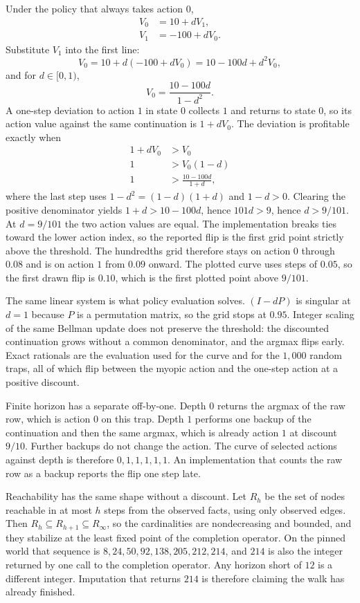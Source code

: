 \documentclass[10pt,twocolumn,letterpaper]{article}
\begin{document}
Under the policy that always takes action $0$,
\begin{align}
V_0 &= 10 + d V_1, \\
V_1 &= -100 + d V_0.
\end{align}
Substitute $V_1$ into the first line:
\[
V_0 = 10 + d(-100 + d V_0) = 10 - 100d + d^2 V_0,
\]
and for $d\in[0,1)$,
\[
V_0 = \frac{10-100d}{1-d^2}.
\]
A one-step deviation to action $1$ in state $0$ collects $1$ and returns to state $0$, so its action value against the same continuation is $1+dV_0$.
The deviation is profitable exactly when
\begin{align}
1 + d V_0 &> V_0 \\
1 &> V_0(1-d) \\
1 &> \frac{10-100d}{1+d},
\end{align}
where the last step uses $1-d^2=(1-d)(1+d)$ and $1-d>0$.
Clearing the positive denominator yields $1+d > 10-100d$, hence $101d>9$, hence $d>9/101$.
At $d=9/101$ the two action values are equal.
The implementation breaks ties toward the lower action index, so the reported flip is the first grid point strictly above the threshold.
The hundredths grid therefore stays on action $0$ through $0.08$ and is on action $1$ from $0.09$ onward.
The plotted curve uses steps of $0.05$, so the first drawn flip is $0.10$, which is the first plotted point above $9/101$.

The same linear system is what policy evaluation solves.
$(I-dP)$ is singular at $d=1$ because $P$ is a permutation matrix, so the grid stops at $0.95$.
Integer scaling of the same Bellman update does not preserve the threshold: the discounted continuation grows without a common denominator, and the argmax flips early.
Exact rationals are the evaluation used for the curve and for the $1{,}000$ random traps, all of which flip between the myopic action and the one-step action at a positive discount.

Finite horizon has a separate off-by-one.
Depth $0$ returns the argmax of the raw row, which is action $0$ on this trap.
Depth $1$ performs one backup of the continuation and then the same argmax, which is already action $1$ at discount $9/10$.
Further backups do not change the action.
The curve of selected actions against depth is therefore $0,1,1,1,1,1$.
An implementation that counts the raw row as a backup reports the flip one step late.

Reachability has the same shape without a discount.
Let $R_h$ be the set of nodes reachable in at most $h$ steps from the observed facts, using only observed edges.
Then $R_h\subseteq R_{h+1}\subseteq R_\infty$, so the cardinalities are nondecreasing and bounded, and they stabilize at the least fixed point of the completion operator.
On the pinned world that sequence is $8,24,50,92,138,205,212,214$, and $214$ is also the integer returned by one call to the completion operator.
Any horizon short of $12$ is a different integer.
Imputation that returns $214$ is therefore claiming the walk has already finished.
\end{document}
